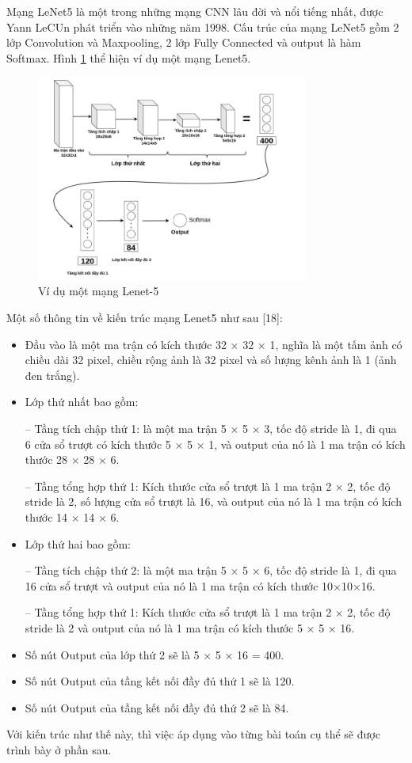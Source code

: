 \documentclass[a4paper]{article}
\begin{document}
Mạng LeNet5 là một trong những mạng CNN lâu đời và nổi tiếng nhất, được Yann LeCUn phát triển vào những năm 1998. Cấu trúc của mạng LeNet5 gồm 2 lớp Convolution và Maxpooling, 2 lớp Fully Connected và output là hàm Softmax. Hình \ref{fig:Lenet5} thể hiện ví dụ một mạng Lenet5.


\begin{figure}[h]
    \centering
    \includegraphics[width=0.8\textwidth]{image/Lenet5.png}
    \caption{Ví dụ một mạng Lenet-5}
    \label{fig:Lenet5}
\end{figure}

Một số thông tin về kiến trúc mạng Lenet5 như sau [18]:
\begin{itemize}
    \item  Đầu vào là một ma trận có kích thước 32 × 32 × 1, nghĩa là một tấm ảnh có chiều dài 32 pixel, chiều rộng ảnh là 32 pixel và số lượng kênh ảnh là 1 (ảnh đen trắng).
    \item  Lớp thứ nhất bao gồm:
    
    – Tầng tích chập thứ 1: là một ma trận 5 × 5 × 3, tốc độ stride là 1, đi qua 6 cửa sổ trượt có kích thước 5 × 5 × 1, và output của nó là 1 ma trận có kích thước 28 × 28 × 6.
    
    – Tầng tổng hợp thứ 1: Kích thước cửa sổ trượt là 1 ma trận 2 × 2, tốc độ stride là 2, số lượng cửa sổ trượt là 16, và output của nó là 1 ma trận có kích thước 14 × 14 × 6.
    \item  Lớp thứ hai bao gồm:
    
    – Tầng tích chập thứ 2: là một ma trận 5 × 5 × 6, tốc độ stride là 1, đi qua 16 cửa sổ trượt và output của nó là 1 ma trận có kích thước 10×10×16.
    
    – Tầng tổng hợp thứ 1: Kích thước cửa sổ trượt là 1 ma trận 2 × 2, tốc độ stride là 2 và output của nó là 1 ma trận có kích thước 5 × 5 × 16.
    \item  Số nút Output của lớp thứ 2 sẽ là 5 × 5 × 16 = 400.
    \item  Số nút Output của tầng kết nối đầy đủ thứ 1 sẽ là 120.
    \item  Số nút Output của tầng kết nối đầy đủ thứ 2 sẽ là 84.
\end{itemize}
Với kiến trúc như thế này, thì việc áp dụng vào từng bài toán cụ thể sẽ được trình bày ở phần sau.
\end{document}

